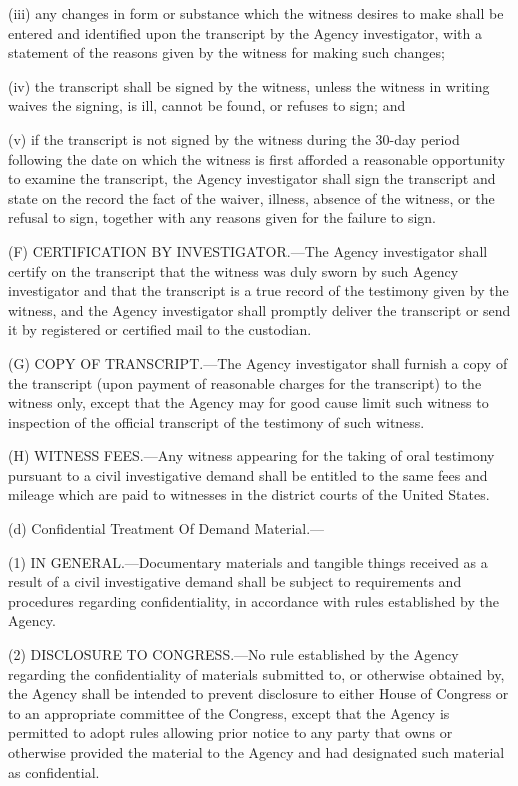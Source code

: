 (iii) any changes in form or substance which the witness desires to make shall be entered and identified upon the transcript by the Agency investigator, with a statement of the reasons given by the witness for making such changes;

(iv) the transcript shall be signed by the witness, unless the witness in writing waives the signing, is ill, cannot be found, or refuses to sign; and

(v) if the transcript is not signed by the witness during the 30-day period following the date on which the witness is first afforded a reasonable opportunity to examine the transcript, the Agency investigator shall sign the transcript and state on the record the fact of the waiver, illness, absence of the witness, or the refusal to sign, together with any reasons given for the failure to sign.

(F) CERTIFICATION BY INVESTIGATOR.—The Agency investigator shall certify on the transcript that the witness was duly sworn by such Agency investigator and that the transcript is a true record of the testimony given by the witness, and the Agency investigator shall promptly deliver the transcript or send it by registered or certified mail to the custodian.

(G) COPY OF TRANSCRIPT.—The Agency investigator shall furnish a copy of the transcript (upon payment of reasonable charges for the transcript) to the witness only, except that the Agency may for good cause limit such witness to inspection of the official transcript of the testimony of such witness.

(H) WITNESS FEES.—Any witness appearing for the taking of oral testimony pursuant to a civil investigative demand shall be entitled to the same fees and mileage which are paid to witnesses in the district courts of the United States.

(d) Confidential Treatment Of Demand Material.—

(1) IN GENERAL.—Documentary materials and tangible things received as a result of a civil investigative demand shall be subject to requirements and procedures regarding confidentiality, in accordance with rules established by the Agency.

(2) DISCLOSURE TO CONGRESS.—No rule established by the Agency regarding the confidentiality of materials submitted to, or otherwise obtained by, the Agency shall be intended to prevent disclosure to either House of Congress or to an appropriate committee of the Congress, except that the Agency is permitted to adopt rules allowing prior notice to any party that owns or otherwise provided the material to the Agency and had designated such material as confidential.

